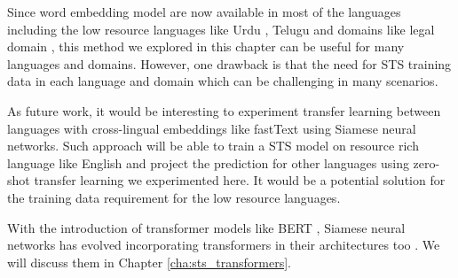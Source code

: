 Since word embedding model are now available in most of the languages including the low resource languages like Urdu \cite{haider-2018-urdu}, Telugu \cite{kumar-etal-2020-passage} and domains like legal domain \cite{Chalkidis2019}, this method we explored in this chapter can be useful for many languages and domains. However, one drawback is that the need for STS training data in each language and domain which can be challenging in many scenarios. 

As future work, it would be interesting to experiment transfer learning between languages with cross-lingual embeddings like fastText \cite{mikolov-etal-2018-advances} using Siamese neural networks. Such approach will be able to train a STS model on resource rich language like English and project the prediction for other languages using zero-shot transfer learning we experimented here. It would be a potential solution for the training data requirement for the low resource languages. 

With the introduction of transformer models like BERT \cite{devlin-etal-2019-bert}, Siamese neural networks has evolved incorporating transformers in their architectures too \cite{reimers-gurevych-2019-sentence}. We will discuss them in Chapter \ref{cha:sts_transformers}. 






